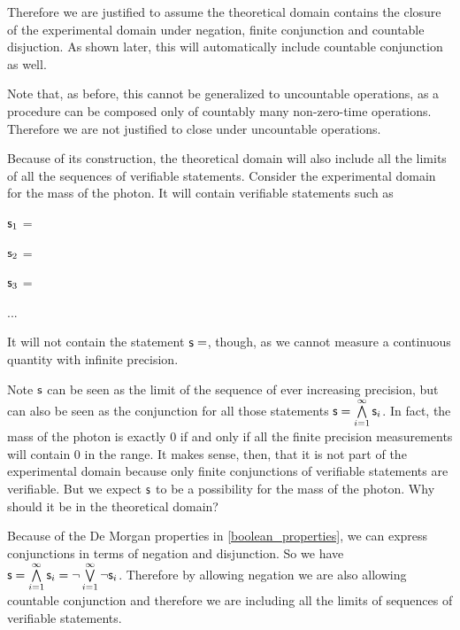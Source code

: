 \documentclass[11pt,letterpaper,fleqn]{memoir} %
\begin{document}
\begin{mathSection}
\begin{justification}
	Therefore we are justified to assume the theoretical domain contains the closure of the experimental domain under negation, finite conjunction and countable disjuction. As shown later, this will automatically include countable conjunction as well.
	
	Note that, as before, this cannot be generalized to uncountable operations, as a procedure can be composed only of countably many non-zero-time operations. Therefore we are not justified to close under uncountable operations.
\end{justification}
\end{mathSection}

Because of its construction, the theoretical domain will also include all the limits of all the sequences of verifiable statements. Consider the experimental domain for the mass of the photon. It will contain verifiable statements such as
\begin{description}
	\item $\mathsf{s}_1$ =
	\item $\mathsf{s}_2$ =
	\item $\mathsf{s}_3$ =
	\item ...
\end{description}
It will not contain the statement $\mathsf{s}=$, though, as we cannot measure a continuous quantity with infinite precision.

Note $\mathsf{s}$ can be seen as the limit of the sequence of ever increasing precision, but can also be seen as the conjunction for all those statements $\mathsf{s}=\bigwedge\limits_{i=1}^{\infty} \mathsf{s}_i$. In fact, the mass of the photon is exactly 0 if and only if all the finite precision measurements will contain 0 in the range. It makes sense, then, that it is not part of the experimental domain because only finite conjunctions of verifiable statements are verifiable. But we expect $\mathsf{s}$ to be a possibility for the mass of the photon. Why should it be in the theoretical domain?

Because of the De Morgan properties in \ref{boolean_properties}, we can express conjunctions in terms of negation and disjunction. So we have $\mathsf{s}=\bigwedge\limits_{i=1}^{\infty} \mathsf{s}_i=\neg \bigvee\limits_{i=1}^{\infty} \neg\mathsf{s}_i$. Therefore by allowing negation we are also allowing countable conjunction and therefore we are including all the limits of sequences of verifiable statements.
\end{document}
